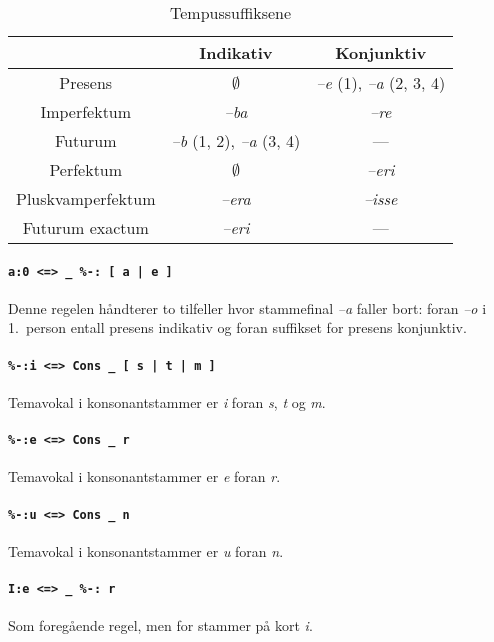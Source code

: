 \documentclass{article}
\begin{document}
\begin{table}[hp]
\begin{center}
\begin{tabular}{|c|c|c|}
    \hline
                  & Indikativ   & Konjunktiv \\
    \hline
Presens           & $\emptyset$ & \emph{--e} (1), \emph{--a} (2, 3, 4) \\
Imperfektum       & \emph{--ba} & \emph{--re} \\
Futurum           & \emph{--b} (1, 2), \emph{--a} (3, 4) & --- \\
    \hline
Perfektum         & $\emptyset$ & \emph{--eri} \\
Pluskvamperfektum & \emph{--era} & \emph{--isse} \\
Futurum exactum   & \emph{--eri} & ---        \\
    \hline
\end{tabular}
\caption{Tempussuffiksene}
\label{tempus}
\end{center}
\end{table}

\paragraph{\texttt{a:0 <=> \_ \%-: [ a | e ]}} Denne regelen h\aa{}ndterer to
tilfeller hvor stammefinal \emph{--a} faller bort: foran \emph{--o} i
1.~person entall presens indikativ og foran suffikset for presens konjunktiv.

\paragraph{\texttt{\%-:i <=> Cons \_ [ s | t | m ]}} Temavokal i
konsonantstammer er \emph{i} foran \emph{s}, \emph{t} og \emph{m}.

\paragraph{\texttt{\%-:e <=> Cons \_ r}} Temavokal i konsonantstammer er
\emph{e} foran \emph{r}.

\paragraph{\texttt{\%-:u <=> Cons \_ n}} Temavokal i konsonantstammer er
\emph{u} foran \emph{n}.

\paragraph{\texttt{I:e <=> \_ \%-: r}} Som foreg\aa{}ende regel, men for
stammer p\aa{} kort \emph{i}.
\end{document}
